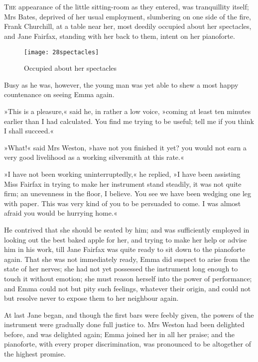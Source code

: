 \chapter[Chapter \thechapter]{}
\lettrine[lines=4,lraise=0.3]{T}{he} appearance of the little sitting-room as they entered, was tranquillity itself; Mrs Bates, deprived of her usual employment, slumbering on one side of the fire, Frank Churchill, at a table near her, most deedily occupied about her spectacles, and Jane Fairfax, standing with her back to them, intent on her pianoforte.

\begin{figure}[tbph]
\centering
\texttt{[image: 28spectacles]}
\caption{Occupied about her spectacles}
\end{figure}

Busy as he was, however, the young man was yet able to shew a most happy countenance on seeing Emma again.

»This is a pleasure,« said he, in rather a low voice, »coming at least ten minutes earlier than I had calculated. You find me trying to be useful; tell me if you think I shall succeed.«

»What!« said Mrs Weston, »have not you finished it yet? you would not earn a very good livelihood as a working silversmith at this rate.«

»I have not been working uninterruptedly,« he replied, »I have been assisting Miss Fairfax in trying to make her instrument stand steadily, it was not quite firm; an unevenness in the floor, I believe. You see we have been wedging one leg with paper. This was very kind of you to be persuaded to come. I was almost afraid you would be hurrying home.«

He contrived that she should be seated by him; and was sufficiently employed in looking out the best baked apple for her, and trying to make her help or advise him in his work, till Jane Fairfax was quite ready to sit down to the pianoforte again. That she was not immediately ready, Emma did suspect to arise from the state of her nerves; she had not yet possessed the instrument long enough to touch it without emotion; she must reason herself into the power of performance; and Emma could not but pity such feelings, whatever their origin, and could not but resolve never to expose them to her neighbour again.

At last Jane began, and though the first bars were feebly given, the powers of the instrument were gradually done full justice to. Mrs Weston had been delighted before, and was delighted again; Emma joined her in all her praise; and the pianoforte, with every proper discrimination, was pronounced to be altogether of the highest promise.


